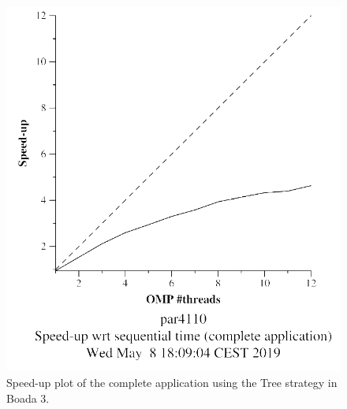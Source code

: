 \documentclass[12pt, a4paper]{article}
\begin{document}
\begin{figure}[H]
\centering
\begin{minipage}[b]{0.4\linewidth}
  \centering
  \includegraphics[scale=0.5]{./images/S2/S2_strong_scalability/multisort-omp-strong_boada-3_tree_complete_application}
  \caption{Speed-up plot of the complete application using the Tree strategy in Boada 3.}
  \label{fig:mandel-omp-10000-strong-21-time}
\end{minipage}%
\hspace{0.5cm}
\begin{minipage}[b]{0.4\linewidth}
  \centering

\end{minipage}
\end{figure}
\end{document}
